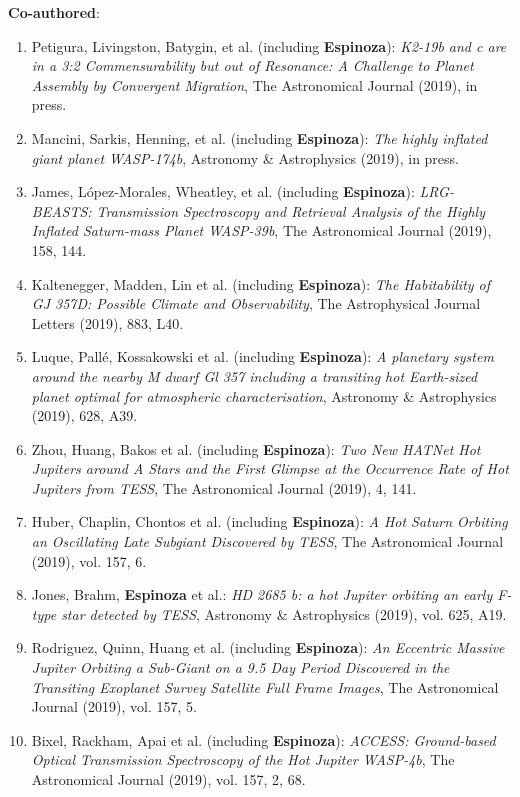 \documentclass[12pt, a4paper]{article} %
\begin{document}
\begin{flushleft}
\textbf{Co-authored}:
\begin{enumerate}
\setlength\itemsep{0.05cm}
\item Petigura, Livingston, Batygin, et al. (including \textbf{Espinoza}): \textit{K2-19b and c are in a 3:2 Commensurability but out of Resonance: A Challenge to Planet Assembly by Convergent Migration}, The Astronomical Journal (2019), in press.
\item Mancini, Sarkis, Henning, et al. (including \textbf{Espinoza}): \textit{The highly inflated giant planet WASP-174b}, Astronomy \& Astrophysics (2019), in press.
\item James, L\'opez-Morales, Wheatley, et al. (including \textbf{Espinoza}): \textit{LRG-BEASTS: Transmission Spectroscopy and Retrieval Analysis of the Highly Inflated Saturn-mass Planet WASP-39b}, The Astronomical Journal (2019), 158, 144.
\item Kaltenegger, Madden, Lin et al. (including \textbf{Espinoza}): \textit{The Habitability of GJ 357D: Possible Climate and Observability}, The Astrophysical Journal Letters (2019), 883, L40.
\item Luque, Pall\'e, Kossakowski et al. (including \textbf{Espinoza}): \textit{A planetary system around the nearby M dwarf Gl 357 including a transiting hot Earth-sized planet optimal for atmospheric characterisation}, Astronomy \& Astrophysics (2019), 628, A39.
\item Zhou, Huang, Bakos et al. (including \textbf{Espinoza}): \textit{Two New HATNet Hot Jupiters around A Stars and the First Glimpse at the Occurrence Rate of Hot Jupiters from TESS}, The Astronomical Journal (2019), 4, 141.
\item Huber, Chaplin, Chontos et al. (including \textbf{Espinoza}): \textit{A Hot Saturn Orbiting an Oscillating Late Subgiant Discovered by TESS}, The Astronomical Journal (2019), vol. 157, 6.
\item Jones, Brahm, \textbf{Espinoza} et al.: \textit{HD 2685 b: a hot Jupiter orbiting an early F-type star detected by TESS}, Astronomy \& Astrophysics (2019), vol. 625, A19.
\item Rodriguez, Quinn, Huang et al. (including \textbf{Espinoza}): \textit{An Eccentric Massive Jupiter Orbiting a Sub-Giant on a 9.5 Day Period Discovered in the Transiting Exoplanet Survey Satellite Full Frame Images}, The Astronomical Journal (2019), vol. 157, 5.
\item Bixel, Rackham, Apai et al. (including \textbf{Espinoza}): \textit{ACCESS: Ground-based Optical Transmission Spectroscopy of the Hot Jupiter WASP-4b}, The Astronomical Journal (2019), vol. 157, 2, 68.

\end{enumerate}
\end{flushleft}
\end{document}
